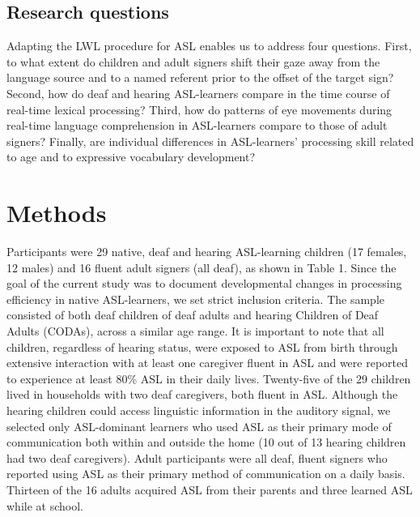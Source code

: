 \documentclass[oneside]{report}
\begin{document}
\subsection{Research questions}\label{research-questions}

Adapting the LWL procedure for ASL enables us to address four questions.
First, to what extent do children and adult signers shift their gaze
away from the language source and to a named referent prior to the
offset of the target sign? Second, how do deaf and hearing ASL-learners
compare in the time course of real-time lexical processing? Third, how
do patterns of eye movements during real-time language comprehension in
ASL-learners compare to those of adult signers? Finally, are individual
differences in ASL-learners' processing skill related to age and to
expressive vocabulary development?

\section{Methods}\label{methods}

Participants were 29 native, deaf and hearing ASL-learning children (17
females, 12 males) and 16 fluent adult signers (all deaf), as shown in
Table 1. Since the goal of the current study was to document
developmental changes in processing efficiency in native ASL-learners,
we set strict inclusion criteria. The sample consisted of both deaf
children of deaf adults and hearing Children of Deaf Adults (CODAs),
across a similar age range. It is important to note that all children,
regardless of hearing status, were exposed to ASL from birth through
extensive interaction with at least one caregiver fluent in ASL and were
reported to experience at least 80\% ASL in their daily lives.
Twenty-five of the 29 children lived in households with two deaf
caregivers, both fluent in ASL. Although the hearing children could
access linguistic information in the auditory signal, we selected only
ASL-dominant learners who used ASL as their primary mode of
communication both within and outside the home (10 out of 13 hearing
children had two deaf caregivers). Adult participants were all deaf,
fluent signers who reported using ASL as their primary method of
communication on a daily basis. Thirteen of the 16 adults acquired ASL
from their parents and three learned ASL while at school.
\end{document}
